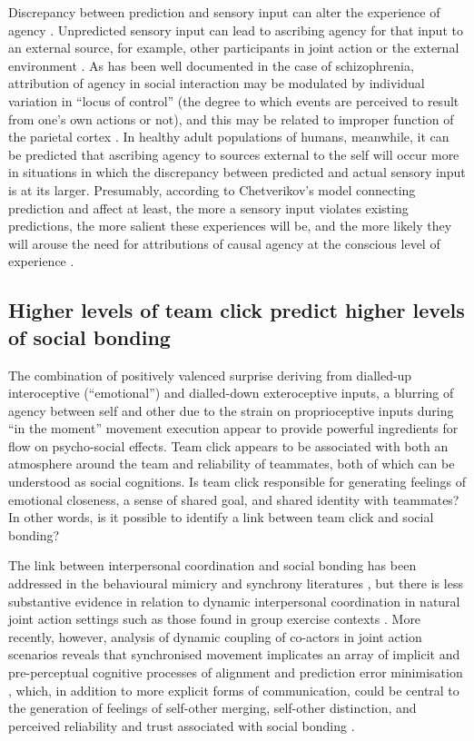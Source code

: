 \begin{CJK}{UTF8}{gbsn}
Discrepancy between prediction and sensory input can alter the experience of agency \citep{Sato2008}.  Unpredicted sensory input can lead to ascribing agency for that input to an external source, for example, other participants in joint action or the external environment \citep{Sato2005,Frith2007}.  As has been well documented in the case of schizophrenia, attribution of agency in social interaction may be modulated by individual variation in ``locus of control'' (the degree to which events are perceived to result from one’s own actions or not), and this may be related to improper function of the parietal cortex \citep{Frith2000}. In healthy adult populations of humans, meanwhile, it can be predicted that ascribing agency to sources external to the self will occur more in situations in which the discrepancy between predicted and actual sensory input is at its larger.  Presumably, according to Chetverikov's model connecting prediction and affect at least, the more a sensory input violates existing predictions, the more salient these experiences will be, and the more likely they will arouse the need for attributions of causal agency at the conscious level of experience \citep{Pesquita2017}.



\subsection{Higher levels of team click predict higher levels of social bonding \label{sect:DVsocialBonding}}

The combination of positively valenced surprise deriving from dialled-up interoceptive (``emotional'') and dialled-down exteroceptive inputs, a blurring of agency between self and other due to the strain on proprioceptive inputs during ``in the moment'' movement execution appear to provide powerful ingredients for flow on psycho-social effects.  Team click appears to be associated with both an atmosphere around the team and reliability of teammates, both of which can be understood as social cognitions.  Is team click responsible for generating feelings of emotional closeness, a sense of shared goal, and shared identity with teammates?  In other words, is it possible to identify a link between team click and social bonding?

The link between interpersonal coordination and social bonding has been addressed in the behavioural mimicry and synchrony literatures \citep[e.g.,][]{Wheatley2012,Launay2016,Mogan2017}, but there is less substantive evidence in relation to dynamic interpersonal coordination in natural joint action settings such as those found in group exercise contexts \citep{Marsh2009,Miles2009,Lumsden2012}.  More recently, however, analysis of dynamic coupling of co-actors in joint action scenarios reveals that synchronised movement implicates an array of implicit and pre-perceptual cognitive processes of alignment and prediction error minimisation \citep{Schmidt2011}, which, in addition to more explicit forms of communication, could be central to the generation of feelings of self-other merging, self-other distinction, and perceived reliability and trust associated with social bonding \citep{Marsh2009}.





\end{CJK}
